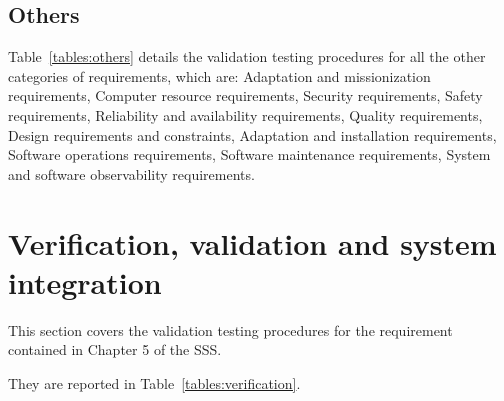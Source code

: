 \subsection{Others}

Table~\ref{tables:others} details the validation testing procedures for all the other categories of requirements, which are:
Adaptation and missionization requirements, Computer resource requirements, Security requirements, Safety requirements, Reliability and availability requirements, Quality requirements, Design requirements and constraints, Adaptation and installation requirements, Software operations requirements, Software maintenance requirements, System and software observability requirements.




\clearpage

\section{Verification, validation and system integration}

This section covers the validation testing procedures for the requirement contained in Chapter 5 of the SSS.

They are reported in Table~\ref{tables:verification}.



